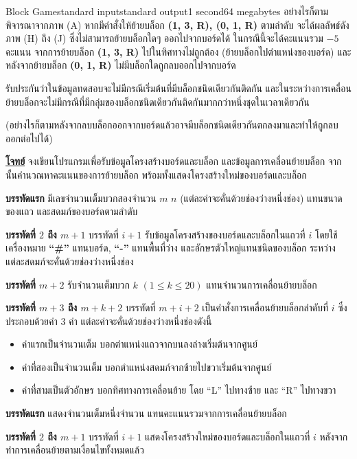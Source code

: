 \documentclass[11pt,a4paper]{article}
\begin{document}
\begin{problem}{Block Game}{standard input}{standard output}{1 second}{64 megabytes}
อย่างไรก็ตาม พิจารณาจากภาพ (A) หากมีคำสั่งให้ย้ายบล็อก \textbf{(1, 3, R), (0, 1, R)} ตามลำดับ จะได้ผลลัพธ์ดังภาพ (H) ถึง (J) ซึ่งไม่สามารถย้ายบล็อกใดๆ ออกไปจากบอร์ดได้ ในกรณีนี้จะได้คะแนนรวม $-5$ คะแนน จากการย้ายบล็อก \textbf{(1, 3, R)} ไปในทิศทางไม่ถูกต้อง (ย้ายบล็อกไปตำแหน่งของบอร์ด) และหลังจากย้ายบล็อก \textbf{(0, 1, R)} ไม่มีบล็อกใดถูกลบออกไปจากบอร์ด

\newpage

รับประกันว่าในข้อมูลทดสอบจะไม่มีกรณีเริ่มต้นที่มีบล็อกชนิดเดียวกันติดกัน และในระหว่างการเคลื่อนย้ายบล็อกจะไม่มีกรณีที่มีกลุ่มของบล็อกชนิดเดียวกันติดกันมากกว่าหนึ่งชุดในเวลาเดียวกัน

(อย่างไรก็ตามหลังจากลบบล็อกออกจากบอร์ดแล้วอาจมีบล็อกชนิดเดียวกันตกลงมาและทำให้ถูกลบออกต่อไปได้)

\underline{\textbf{โจทย์}}  จงเขียนโปรแกรมเพื่อรับข้อมูลโครงสร้างบอร์ดและบล็อก และข้อมูลการเคลื่อนย้ายบล็อก จากนั้นคำนวณหาคะแนนของการย้ายบล็อก พร้อมทั้งแสดงโครงสร้างใหม่ของบอร์ดและบล็อก

\InputFile

\textbf{บรรทัดแรก} มีเลขจำนวนเต็มบวกสองจำนวน $m$ $n$  (แต่ละค่าจะคั่นด้วยช่องว่างหนึ่งช่อง) แทนขนาดของแถว และสดมภ์ของบอร์ดตามลำดับ

\textbf{บรรทัดที่ $2$ ถึง $m+1$} บรรทัดที่ $i+1$ รับข้อมูลโครงสร้างของบอร์ดและบล็อกในแถวที่ $i$ โดยใช้เครื่องหมาย \textbf{“\#”} แทนบอร์ด, \textbf{“-”} แทนพื้นที่ว่าง และอักษรตัวใหญ่แทนชนิดของบล็อก ระหว่างแต่ละสดมภ์จะคั่นด้วยช่องว่างหนึ่งช่อง

\textbf{บรรทัดที่ $m+2$} รับจำนวนเต็มบวก $k$ $(1 \leq k \leq 20)$ แทนจำนวนการเคลื่อนย้ายบล็อก

\textbf{บรรทัดที่ $m+3$ ถึง $m+k+2$} บรรทัดที่ $m+i+2$ เป็นคำสั่งการเคลื่อนย้ายบล็อกลำดับที่ $i$ ซึ่งประกอบด้วยค่า $3$ ค่า แต่ละค่าจะคั่นด้วยช่องว่างหนึ่งช่องดังนี้
\begin{itemize}

\item ค่าแรกเป็นจำนวนเต็ม บอกตำแหน่งแถวจากบนลงล่างเริ่มต้นจากศูนย์
\item ค่าที่สองเป็นจำนวนเต็ม บอกตำแหน่งสดมภ์จากซ้ายไปขวาเริ่มต้นจากศูนย์
\item ค่าที่สามเป็นตัวอักษร บอกทิศทางการเคลื่อนย้าย โดย “L” ไปทางซ้าย และ “R” ไปทางขวา
\end{itemize}

\OutputFile

\textbf{บรรทัดแรก} แสดงจำนวนเต็มหนึ่งจำนวน แทนคะแนนรวมจากการเคลื่อนย้ายบล็อก

\textbf{บรรทัดที่ $2$ ถึง $m+1$} บรรทัดที่ $i+1$  แสดงโครงสร้างใหม่ของบอร์ดและบล็อกในแถวที่ $i$ หลังจากทำการเคลื่อนย้ายตามเงื่อนไขทั้งหมดแล้ว


\end{problem}
\end{document}
